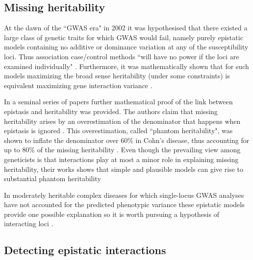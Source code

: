 \subsection{Missing heritability}

At the dawn of the ``GWAS era" in 2002 it was hypothesised that there existed a large class of genetic traits for which GWAS would fail, namely purely epistatic models containing no additive or dominance variation at any of the susceptibility loci. 
Thus association case/control methods ``will have no power if the loci are examined individually" \cite{culverhouse2002perspective}.
Furthermore, it was mathematically shown that for such models maximizing the broad sense heritability (under some constraints) is equivalent maximizing gene interaction variance \cite{culverhouse2002perspective}.

In a seminal series of papers \cite{zuk2012mystery, zuk2014searching} further mathematical proof of the link between epistasis and heritability was provided.
The authors claim that missing heritability arises by an overestimation of the denominator that happens when epistasis is ignored \cite{zuk2012mystery}.
This overestimation, called ``phantom heritability", was shown to inflate the denominator over $60\%$ in Cohn's disease, thus accounting for up to $80\%$ of the missing heritability \cite{zuk2012mystery}.
Even though the prevailing view among geneticists is that interactions play at most a minor role in explaining missing heritability, their works shows that simple and plausible models can give rise to substantial phantom heritability \cite{zuk2012mystery}

In moderately heritable complex diseases for which single-locus GWAS analyses have not accounted for the predicted phenotypic variance these epistatic models provide one possible explanation so it is worth pursuing a hypothesis of interacting loci \cite{culverhouse2002perspective}.

\subsection{Detecting epistatic interactions}

